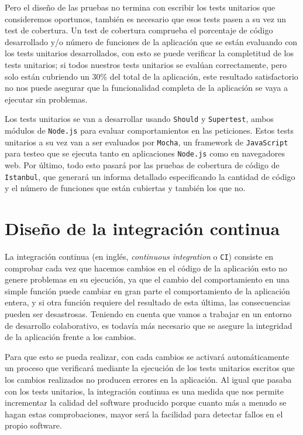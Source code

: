 Pero el diseño de las pruebas no termina con escribir los tests unitarios que consideremos oportunos, también es necesario que esos tests pasen a su vez un test de cobertura. Un test de cobertura comprueba el porcentaje de código desarrollado y/o número de funciones de la aplicación que se están evaluando con los tests unitarios desarrollados, con esto se puede verificar la completitud de los tests unitarios; si todos nuestros tests unitarios se evalúan correctamente, pero solo están cubriendo un 30\% del total de la aplicación, este resultado satisfactorio no nos puede asegurar que la funcionalidad completa de la aplicación se vaya a ejecutar sin problemas.

\bigskip
Los tests unitarios se van a desarrollar usando {\tt Should} y {\tt Supertest}, ambos módulos de {\tt Node.js} para evaluar comportamientos en las peticiones. Estos tests unitarios a su vez van a ser evaluados por {\tt Mocha}, un framework de {\tt JavaScript} para testeo que se ejecuta tanto en aplicaciones {\tt Node.js} como en navegadores web. Por último, todo esto pasará por las pruebas de cobertura de código de {\tt Istanbul}, que generará un informa detallado especificando la cantidad de código y el número de funciones que están cubiertas y también los que no.

\section{Diseño de la integración continua}

La integración continua (en inglés, \textit{continuous integration} o {\tt CI}) consiste en comprobar cada vez que hacemos cambios en el código de la aplicación esto no genere problemas en su ejecución, ya que el cambio del comportamiento en una simple función puede cambiar en gran parte el comportamiento de la aplicación entera, y si otra función requiere del resultado de esta última, las consecuencias pueden ser desastrosas. Teniendo en cuenta que vamos a trabajar en un entorno de desarrollo colaborativo, es todavía más necesario que se asegure la integridad de la aplicación frente a los cambios.

\bigskip
Para que esto se pueda realizar, con cada cambios se activará automáticamente un proceso que verificará mediante la ejecución de los tests unitarios escritos que los cambios realizados no producen errores en la aplicación. Al igual que pasaba con los tests unitarios, la integración continua es una medida que nos permite incrementar la calidad del software producido porque cuanto más a menudo se hagan estas comprobaciones, mayor será la facilidad para detectar fallos en el propio software.

